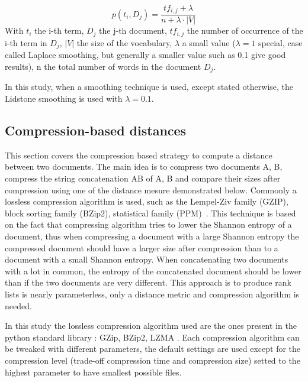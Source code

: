 \begin{definition}
  \label{def:lidstone_smoothing}
  \begin{equation}
    p(t_i, D_j) = \frac{tf_{i,j} + \lambda}{n + \lambda \cdot |V|}
  \end{equation}
  With $t_i$ the i-th term, $D_j$ the j-th document, $tf_{i,j}$ the number of occurrence of the i-th term in $D_j$, $|V|$ the size of the vocabulary, $\lambda$ a small value ($\lambda = 1$ special, case called Laplace smoothing, but generally a smaller value such as 0.1 give good results), n the total number of words in the document $D_j$.
\end{definition}

In this study, when a smoothing technique is used, except stated otherwise, the Lidstone smoothing is used with $\lambda = 0.1$.

\subsection{Compression-based distances \label{sec:compression_based_distances}}

This section covers the compression based strategy to compute a distance between two documents.
The main idea is to compress two documents A, B, compress the string concatenation AB of A, B and compare their sizes after compression using one of the distance mesure demonstrated below.
Commonly a lossless compression algorithm is used, such as the Lempel-Ziv family (GZIP), block sorting family (BZip2), statistical family (PPM)~\cite{comparing_compression}.
This technique is based on the fact that compressing algorithm tries to lower the Shannon entropy of a document, thus when compressing a document with a large Shannon entropy the compressed document should have a larger size after compression than to a document with a small Shannon entropy.
When concatenating two documents with a lot in common, the entropy of the concatenated document should be lower than if the two documents are very different.
This approach is to produce rank lists is nearly parameterless, only a distance metric and compression algorithm is needed.

In this study the lossless compression algorithm used are the ones present in the python standard library : GZip, BZip2, LZMA \cite{python_compression}.
Each compression algorithm can be tweaked with different parameters, the default settings are used except for the compression level (trade-off compression time and compression size) setted to the highest parameter to have smallest possible files.

